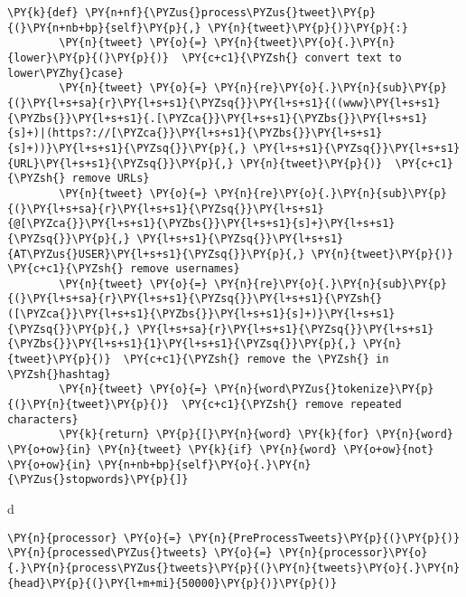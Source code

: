 \begin{tcolorbox}[breakable, size=fbox, boxrule=1pt, pad at break*=1mm,colback=cellbackground, colframe=cellborder]
\begin{Verbatim}[commandchars=\\\{\}]
    \PY{k}{def} \PY{n+nf}{\PYZus{}process\PYZus{}tweet}\PY{p}{(}\PY{n+nb+bp}{self}\PY{p}{,} \PY{n}{tweet}\PY{p}{)}\PY{p}{:}
        \PY{n}{tweet} \PY{o}{=} \PY{n}{tweet}\PY{o}{.}\PY{n}{lower}\PY{p}{(}\PY{p}{)}  \PY{c+c1}{\PYZsh{} convert text to lower\PYZhy{}case}
        \PY{n}{tweet} \PY{o}{=} \PY{n}{re}\PY{o}{.}\PY{n}{sub}\PY{p}{(}\PY{l+s+sa}{r}\PY{l+s+s1}{\PYZsq{}}\PY{l+s+s1}{((www}\PY{l+s+s1}{\PYZbs{}}\PY{l+s+s1}{.[\PYZca{}}\PY{l+s+s1}{\PYZbs{}}\PY{l+s+s1}{s]+)|(https?://[\PYZca{}}\PY{l+s+s1}{\PYZbs{}}\PY{l+s+s1}{s]+))}\PY{l+s+s1}{\PYZsq{}}\PY{p}{,} \PY{l+s+s1}{\PYZsq{}}\PY{l+s+s1}{URL}\PY{l+s+s1}{\PYZsq{}}\PY{p}{,} \PY{n}{tweet}\PY{p}{)}  \PY{c+c1}{\PYZsh{} remove URLs}
        \PY{n}{tweet} \PY{o}{=} \PY{n}{re}\PY{o}{.}\PY{n}{sub}\PY{p}{(}\PY{l+s+sa}{r}\PY{l+s+s1}{\PYZsq{}}\PY{l+s+s1}{@[\PYZca{}}\PY{l+s+s1}{\PYZbs{}}\PY{l+s+s1}{s]+}\PY{l+s+s1}{\PYZsq{}}\PY{p}{,} \PY{l+s+s1}{\PYZsq{}}\PY{l+s+s1}{AT\PYZus{}USER}\PY{l+s+s1}{\PYZsq{}}\PY{p}{,} \PY{n}{tweet}\PY{p}{)}  \PY{c+c1}{\PYZsh{} remove usernames}
        \PY{n}{tweet} \PY{o}{=} \PY{n}{re}\PY{o}{.}\PY{n}{sub}\PY{p}{(}\PY{l+s+sa}{r}\PY{l+s+s1}{\PYZsq{}}\PY{l+s+s1}{\PYZsh{}([\PYZca{}}\PY{l+s+s1}{\PYZbs{}}\PY{l+s+s1}{s]+)}\PY{l+s+s1}{\PYZsq{}}\PY{p}{,} \PY{l+s+sa}{r}\PY{l+s+s1}{\PYZsq{}}\PY{l+s+s1}{\PYZbs{}}\PY{l+s+s1}{1}\PY{l+s+s1}{\PYZsq{}}\PY{p}{,} \PY{n}{tweet}\PY{p}{)}  \PY{c+c1}{\PYZsh{} remove the \PYZsh{} in \PYZsh{}hashtag}
        \PY{n}{tweet} \PY{o}{=} \PY{n}{word\PYZus{}tokenize}\PY{p}{(}\PY{n}{tweet}\PY{p}{)}  \PY{c+c1}{\PYZsh{} remove repeated characters}
        \PY{k}{return} \PY{p}{[}\PY{n}{word} \PY{k}{for} \PY{n}{word} \PY{o+ow}{in} \PY{n}{tweet} \PY{k}{if} \PY{n}{word} \PY{o+ow}{not} \PY{o+ow}{in} \PY{n+nb+bp}{self}\PY{o}{.}\PY{n}{\PYZus{}stopwords}\PY{p}{]}
\end{Verbatim}
\end{tcolorbox}
d
    \begin{tcolorbox}[breakable, size=fbox, boxrule=1pt, pad at break*=1mm,colback=cellbackground, colframe=cellborder]
\begin{Verbatim}[commandchars=\\\{\}]
\PY{n}{processor} \PY{o}{=} \PY{n}{PreProcessTweets}\PY{p}{(}\PY{p}{)}
\PY{n}{processed\PYZus{}tweets} \PY{o}{=} \PY{n}{processor}\PY{o}{.}\PY{n}{process\PYZus{}tweets}\PY{p}{(}\PY{n}{tweets}\PY{o}{.}\PY{n}{head}\PY{p}{(}\PY{l+m+mi}{50000}\PY{p}{)}\PY{p}{)}
\end{Verbatim}
\end{tcolorbox}

